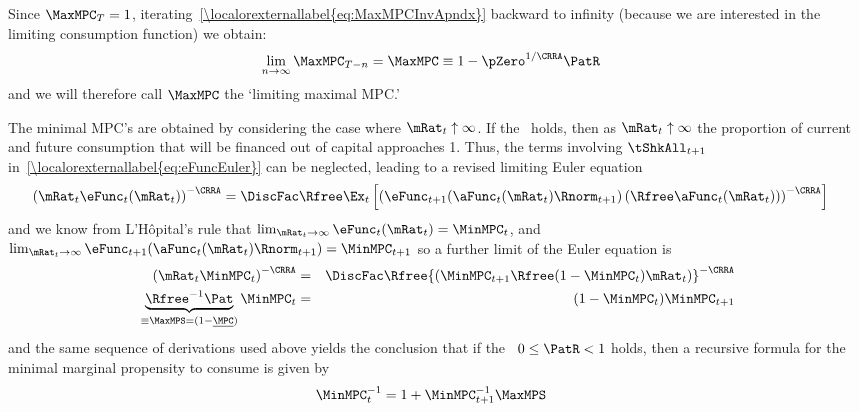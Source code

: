 \documentclass[\econtexRoot/BufferStockTheory]{subfiles}
\begin{document}
Since $\MaxMPC_{T}=1$, iterating~\eqref{\localorexternallabel{eq:MaxMPCInvApndx}} backward to
infinity (because we are interested in the limiting consumption function) we obtain:
\begin{equation}\begin{gathered}\begin{aligned}
\lim_{n\rightarrow\infty}\MaxMPC_{T-n} 
& = \MaxMPC \equiv 1-\pZero^{1/\CRRA}\PatR  \label{eq:MaxMPCDef}
\end{aligned}\end{gathered}\end{equation}
and we will therefore call $\MaxMPC$ the `limiting maximal MPC.'

The minimal MPC's are obtained by considering the case where $\mRat_{t} \uparrow \infty$.  If the \FHWC~holds, then as $\mRat_{t} \uparrow \infty$ the proportion of current and future consumption that will be financed out of capital approaches 1.  Thus, the terms involving $\tShkAll_{t+1}$ in~\eqref{\localorexternallabel{eq:eFuncEuler}} can be neglected, leading to a revised limiting Euler equation
\begin{eqnarray*}
 {({\mRat_{t}}\eFunc_{t}(\mRat_{t}))}^{-\CRRA}  & = \DiscFac \Rfree \Ex_{t}\left[{\left(\eFunc_{t+1}(\aFunc_{t}(\mRat_{t})\Rnorm_{t+1})\left({\Rfree \aFunc_{t}(\mRat_{t})}\right)\right)}^{-\CRRA}\right]
\end{eqnarray*}
and we know from L'H\^opital's rule that $\lim_{\mRat_{t} \rightarrow \infty} \eFunc_{t}(\mRat_{t}) = \MinMPC_{t}$, and $\lim_{\mRat_{t} \rightarrow \infty} \eFunc_{t+1}(\aFunc_{t}(\mRat_{t})\Rnorm_{t+1}) = \MinMPC_{t+1}$ so a further limit of the Euler equation is\hypertarget{MPCnvrs}{}
\begin{eqnarray*}
  {(\mRat_{t}\MinMPC_{t})}^{-\CRRA}  & = & \DiscFac \Rfree {\left(\MinMPC_{t+1} \Rfree (1-\MinMPC_{t})\mRat_{t}\right)}^{-\CRRA}
\\ \underbrace{{\Rfree}^{-1}{\Pat}}_{\equiv \MaxMPS = (1-\underline{\MPC})} \MinMPC_{t}  & = & (1-\MinMPC_{t}) \MinMPC_{t+1}
\end{eqnarray*}
and the same sequence of derivations used above yields the conclusion
that if the \RIC~$0 \leq \PatR < 1$ holds, then a recursive formula for the
minimal marginal propensity to consume is given by
\begin{equation}\begin{gathered}\begin{aligned}
 \MinMPC_{t}^{-1}  & = 1+\MinMPC_{t+1}^{-1}\MaxMPS  \label{eq:MinMPCInvApndx}
\end{aligned}\end{gathered}\end{equation}
\end{document}

